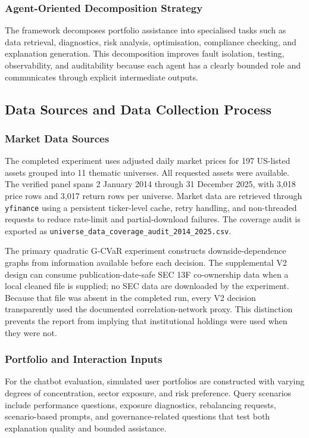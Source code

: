 \documentclass[11pt]{article}
\begin{document}
\subsubsection{Agent-Oriented Decomposition Strategy}
The framework decomposes portfolio assistance into specialised tasks such as data retrieval, diagnostics, risk analysis, optimisation, compliance checking, and explanation generation. This decomposition improves fault isolation, testing, observability, and auditability because each agent has a clearly bounded role and communicates through explicit intermediate outputs.

\subsection{Data Sources and Data Collection Process}
\subsubsection{Market Data Sources}
The completed experiment uses adjusted daily market prices for 197 US-listed assets grouped into 11 thematic universes. All requested assets were available. The verified panel spans 2 January 2014 through 31 December 2025, with 3,018 price rows and 3,017 return rows per universe. Market data are retrieved through \texttt{yfinance} using a persistent ticker-level cache, retry handling, and non-threaded requests to reduce rate-limit and partial-download failures. The coverage audit is exported as \texttt{universe\_data\_coverage\_audit\_2014\_2025.csv}.

The primary quadratic G-CVaR experiment constructs downside-dependence graphs from information available before each decision. The supplemental V2 design can consume publication-date-safe SEC 13F co-ownership data when a local cleaned file is supplied; no SEC data are downloaded by the experiment. Because that file was absent in the completed run, every V2 decision transparently used the documented correlation-network proxy. This distinction prevents the report from implying that institutional holdings were used when they were not.

\subsubsection{Portfolio and Interaction Inputs}
For the chatbot evaluation, simulated user portfolios are constructed with varying degrees of concentration, sector exposure, and risk preference. Query scenarios include performance questions, exposure diagnostics, rebalancing requests, scenario-based prompts, and governance-related questions that test both explanation quality and bounded assistance.
\end{document}
